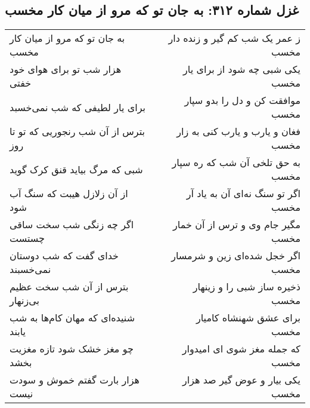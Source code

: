 \begin{center}
\section*{غزل شماره ۳۱۲: به جان تو که مرو از میان کار مخسب}
\label{sec:0312}
\begin{longtable}{l p{0.5cm} r}
به جان تو که مرو از میان کار مخسب
&&
ز عمر یک شب کم گیر و زنده دار مخسب
\\
هزار شب تو برای هوای خود خفتی
&&
یکی شبی چه شود از برای یار مخسب
\\
برای یار لطیفی که شب نمی‌خسبد
&&
موافقت کن و دل را بدو سپار مخسب
\\
بترس از آن شب رنجوریی که تو تا روز
&&
فغان و یارب و یارب کنی به زار مخسب
\\
شبی که مرگ بیاید قنق کرک گوید
&&
به حق تلخی آن شب که ره سپار مخسب
\\
از آن زلازل هیبت که سنگ آب شود
&&
اگر تو سنگ نه‌ای آن به یاد آر مخسب
\\
اگر چه زنگی شب سخت ساقی چستست
&&
مگیر جام وی و ترس از آن خمار مخسب
\\
خدای گفت که شب دوستان نمی‌خسبند
&&
اگر خجل شده‌ای زین و شرمسار مخسب
\\
بترس از آن شب سخت عظیم بی‌زنهار
&&
ذخیره ساز شبی را و زینهار مخسب
\\
شنیده‌ای که مهان کام‌ها به شب یابند
&&
برای عشق شهنشاه کامیار مخسب
\\
چو مغز خشک شود تازه مغزیت بخشد
&&
که جمله مغز شوی ای امیدوار مخسب
\\
هزار بارت گفتم خموش و سودت نیست
&&
یکی بیار و عوض گیر صد هزار مخسب
\\
\end{longtable}
\end{center}
